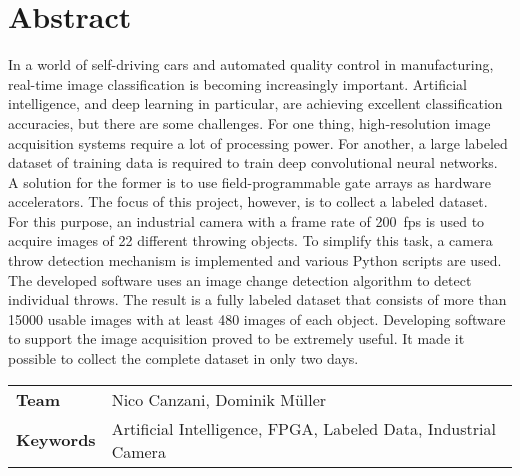 \chapter*{Abstract}
\noindent In a world of self-driving cars and automated quality control in manufacturing, real-time image classification is becoming increasingly important.
Artificial intelligence, and deep learning in particular, are achieving excellent classification accuracies, but there are some challenges.
For one thing, high-resolution image acquisition systems require a lot of processing power.
For another, a large labeled dataset of training data is required to train deep convolutional neural networks.
A solution for the former is to use field-programmable gate arrays as hardware accelerators.
The focus of this project, however, is to collect a labeled dataset.
For this purpose, an industrial camera with a frame rate of \SI{200}{fps} is used to acquire images of 22 different throwing objects.
To simplify this task, a camera throw detection mechanism is implemented and various Python scripts are used.
The developed software uses an image change detection algorithm to detect individual throws.
The result is a fully labeled dataset that consists of more than \num{15000} usable images with at least 480 images of each object.
Developing software to support the image acquisition proved to be extremely useful.
It made it possible to collect the complete dataset in only two days.


\vspace{3em}
\begin{tabular}{>{\bfseries}ll}
  Team  & Nico Canzani, Dominik M\"uller \\
  Keywords & Artificial Intelligence, FPGA, Labeled Data, Industrial Camera
\end{tabular}
